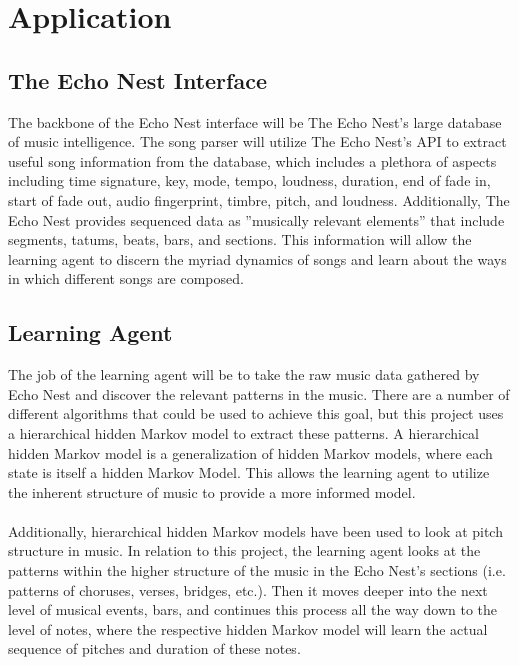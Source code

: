 \documentclass{article}
\begin{document}
\section{Application}
\subsection{The Echo Nest Interface}
The backbone of the Echo Nest interface will be The Echo Nest’s large database of music intelligence. The
song parser will utilize The Echo Nest’s API to extract useful song information from the database, which
includes a plethora of aspects including time signature, key, mode, tempo, loudness, duration, end of fade
in, start of fade out, audio fingerprint, timbre, pitch, and loudness. Additionally, The Echo Nest provides
sequenced data as ”musically relevant elements” that include segments, tatums, beats, bars, and sections.
This information will allow the learning agent to discern the myriad dynamics of songs and learn about the
ways in which different songs are composed.

\subsection{Learning Agent}
The job of the learning agent will be to take the raw music data gathered by Echo Nest and discover the
relevant patterns in the music. There are a number of different algorithms that could be used to achieve this
goal, but this project uses a hierarchical hidden Markov model to extract these patterns. A hierarchical 
hidden Markov model is a generalization of hidden Markov models, where each state is itself a hidden Markov
Model. \cite{Fine:1998:HHM:325865.325879} This allows the learning agent to utilize the inherent structure of 
music to provide a more informed model.\\
\\
Additionally, hierarchical hidden Markov models have been used to look at pitch structure in music.   \cite{_learningmusical}
In relation to this project, the learning agent looks at the patterns within the higher structure of the 
music in the Echo Nest's sections (i.e. patterns of choruses, verses, bridges, etc.). Then it moves deeper
into the next level of musical events, bars, and continues this process all the way down to the level of notes,
where the respective hidden Markov model will learn the actual sequence of pitches and duration of these notes. 
\end{document}
